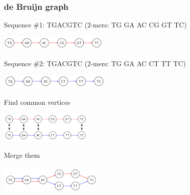 
\begin{frame}
	\frametitle{de Bruijn graph}
	\centering
	  
  Sequence \#1: {\color{red} TGACGTC} ($2$-mers: {\color{red} TG GA AC CG GT TC})
  
  \medskip

	\includegraphics[height=0.7cm]{images/debruin-0}

  \medskip
  
  Sequence \#2: {\color{blue}TGACGTC} ($2$-mers: {\color{blue} TG GA AC CT TT TC})
	
	\medskip
	
	\includegraphics[height=0.7cm]{images/debruin-1}
	
	\medskip
	
	Find common vertices

	\medskip
  \includegraphics[height=1.5cm]{images/debruin-2}

  \medskip
  
  Merge them
	\medskip

	\includegraphics[height=1.3cm]{images/debruin-3}


\end{frame}


